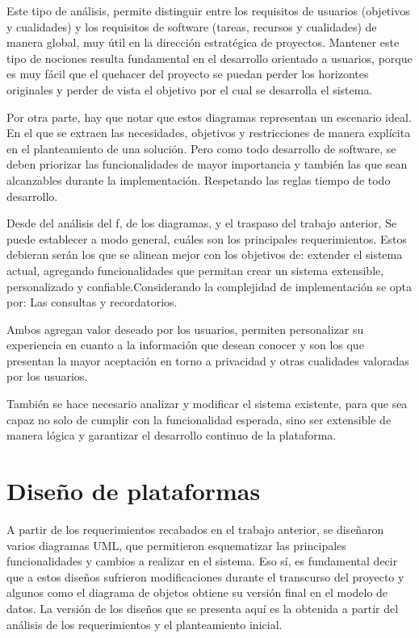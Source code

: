         
    \par Este tipo de análisis, permite distinguir entre los requisitos de usuarios (objetivos y cualidades) y los requisitos de software (tareas, recursos y cualidades) de manera global, muy útil en la dirección estratégica de proyectos. Mantener este tipo de nociones resulta fundamental en el desarrollo orientado a usuarios, porque es muy fácil que el quehacer del proyecto se puedan perder los horizontes originales y perder de vista el objetivo por el cual se desarrolla el sistema.
    \par Por otra parte, hay que notar que estos diagramas representan un escenario ideal. En el que se extraen las necesidades, objetivos y restricciones de manera explícita en el planteamiento de una solución. Pero como todo desarrollo de software, se deben priorizar las funcionalidades de mayor importancia y también las que sean alcanzables durante la implementación. Respetando las reglas tiempo de todo desarrollo.
    \par Desde del análisis del \acrlong{f}, de los diagramas, y el traspaso del trabajo anterior, Se puede establecer a modo general, cuáles son los principales requerimientos. Estos debieran serán los que se alinean mejor con los objetivos de: \guillemotleft extender el sistema actual, agregando funcionalidades que permitan crear un sistema extensible, personalizado y confiable.\guillemotright Considerando la complejidad de implementación se opta por: Las consultas y recordatorios. 
    \par Ambos agregan valor deseado por los usuarios, permiten personalizar su experiencia en cuanto a la información que desean conocer y son los que presentan la mayor aceptación en torno a privacidad y otras cualidades valoradas por los usuarios.
    \par También se hace necesario analizar y modificar el sistema existente, para que sea capaz no solo de cumplir con la funcionalidad esperada, sino ser extensible de manera lógica y garantizar el desarrollo continuo de la plataforma.

\section{Diseño de plataformas}
    A partir de los requerimientos recabados en el trabajo anterior, se diseñaron varios diagramas UML, que permitieron esquematizar las principales funcionalidades y cambios a realizar en el sistema. Eso sí, es fundamental decir que a estos diseños sufrieron modificaciones durante el transcurso del proyecto y algunos como el diagrama de objetos obtiene su versión final en el modelo de datos. La versión de los diseños que se presenta aquí es la obtenida a partir del análisis de los requerimientos y el planteamiento inicial.

